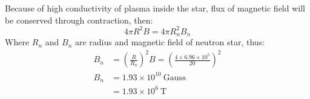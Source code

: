 Because of high conductivity of plasma inside the star, flux of magnetic field
will be conserved through contraction, then:
\[
4\pi R^2 B = 4\pi R_n^2 B_n \tag*{(6 points)}
\]
Where $R_n$ and $B_n$ are radius and magnetic field of neutron star, thus:
\begin{align*}
B_n &= \left(\frac{R}{R_n}\right)^2 B
     = \left(\frac{4 \times 6.96 \times 10^{5}}{20}\right)^2 \tag*{(2 points)}\\
B_n &= 1.93 \times 10^{10}~\mathrm{Gauss}\\
    &= 1.93 \times 10^{6}~\mathrm{T} \tag*{(2 points)}
\end{align*}
